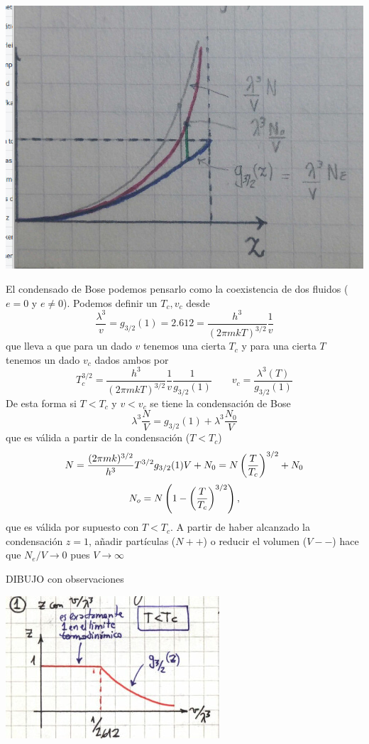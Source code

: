 \documentclass[10pt,oneside]{CBFT_book}
\begin{document}
\includegraphics[scale=0.5]{images/1625624568.jpg}


El condensado de Bose podemos pensarlo como la coexistencia de dos fluidos ($e=0$ y $e\neq 0$).
Podemos definir un $ T_c, v_c $ desde 
\[
	\frac{\lambda^3}{v} = g_{3/2}(1) = 2.612 = \frac{h^3}{(2 \pi m k T)^{3/2}} \frac{1}{v}
\]
que lleva a que para un dado $v$ tenemos una cierta $T_c$ y para una cierta $T$ tenemos un 
dado $v_c$ dados ambos por 
\[
	T_c^{3/2} = \frac{h^3}{(2 \pi m k T)^{3/2}} \frac{1}{v} \frac{1}{g_{3/2}(1)} \qquad 
	v_c = \frac{\lambda^3(T)}{g_{3/2}(1)}
\]
De esta forma si $ T<T_c$ y $v<v_c$ se tiene la condensación de Bose
\[
	\lambda^3\frac{N}{V} = g_{3/2}(1) + \lambda^3\frac{N_0}{V}
\]
que es válida a partir de la condensación ($T<T_c$)
\[
	N =  \frac{(2 \pi m k )^{3/2}}{h^3} T^{3/2} g_{3/2}(1)  V + N_0 = N \left( \frac{ T }{ T_c } \right)^{3/2} + N_0
\]
\[
	N_o = N \left( 1 - \left( \frac{ T }{ T_c } \right)^{3/2} \right),
\]
que es válida por supuesto con $T<T_c$.
A partir de haber alcanzado la condensación $z=1$, añadir partículas ($N++$) o reducir el volumen 
($V--$) hace que $N_e/V \to 0 $ pues $V \to \infty$

DIBUJO con observaciones

\includegraphics[scale=0.5]{images/1606329632.jpg}
\end{document}

